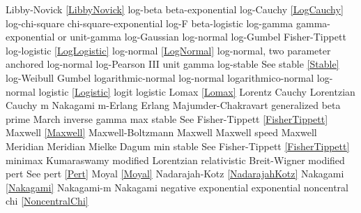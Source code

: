 Libby-Novick					\dotfill	\eqref{LibbyNovick}					\ncite	
log-beta						\dotfill	beta-exponential					 	%
log-Cauchy						\dotfill	\eqref{LogCauchy}					\ncite
log-chi-square					\dotfill	chi-square-exponential				\ncite	%
log-F							\dotfill	beta-logistic						\ncite	%
log-gamma 						\dotfill	gamma-exponential or unit-gamma		\ncite	%
log-Gaussian					\dotfill	log-normal							\ncite	%
log-Gumbel						\dotfill	Fisher-Tippett						\ncite	%
log-logistic					\dotfill	\eqref{LogLogistic}  				\ncite	%
log-normal						\dotfill	\eqref{LogNormal}					\ncite	%
log-normal, two parameter		\dotfill	anchored log-normal					\ncite	%
log-Pearson III					\dotfill	unit gamma							\ncite
log-stable						\dotfill	See stable \eqref{Stable}			\ncite
log-Weibull 					\dotfill	Gumbel 								\ncite	%
logarithmic-normal				\dotfill	log-normal 							\ncite	%
logarithmico-normal				\dotfill	log-normal 							\ncite	%
logistic 						\dotfill	\eqref{Logistic} 					\ncite	%
logit							\dotfill	logistic 							\ncite	%
Lomax 							\dotfill	\eqref{Lomax}						\ncite	%
Lorentz  						\dotfill	Cauchy 								\ncite	%
Lorentzian  					\dotfill	Cauchy 								\ncite	%
%
m 								\dotfill	Nakagami 							 	%
m-Erlang						\dotfill	Erlang 								\ncite	%
Majumder-Chakravart				\dotfill	generalized beta prime				 %
March 							\dotfill	inverse gamma						\ncite	%
max stable						\dotfill	See Fisher-Tippett \eqref{FisherTippett}	\ncite
Maxwell 						\dotfill	\eqref{Maxwell} 					\ncite	%
Maxwell-Boltzmann 				\dotfill	Maxwell 							\ncite 	%
Maxwell speed					\dotfill	Maxwell 							\ncite	%
Meridian						\dotfill	Meridian							\ncite
Mielke							\dotfill	Dagum								\ncite	%
min stable						\dotfill	See Fisher-Tippett \eqref{FisherTippett}	\ncite
minimax 						\dotfill	Kumaraswamy 						 	%
modified Lorentzian				\dotfill	relativistic Breit-Wigner				%
modified pert					\dotfill	See pert \eqref{Pert}				\ncite	%
Moyal							\dotfill	\eqref{Moyal}						\ncite	
%
Nadarajah-Kotz					\dotfill	\eqref{NadarajahKotz}				\mcite{\self}	%
Nakagami 						\dotfill	\eqref{Nakagami} 					\ncite	%
Nakagami-m 						\dotfill	Nakagami 							\ncite   	%
negative exponential			\dotfill	exponential 						\ncite	%
noncentral chi					\dotfill	\eqref{NoncentralChi}				\ncite
